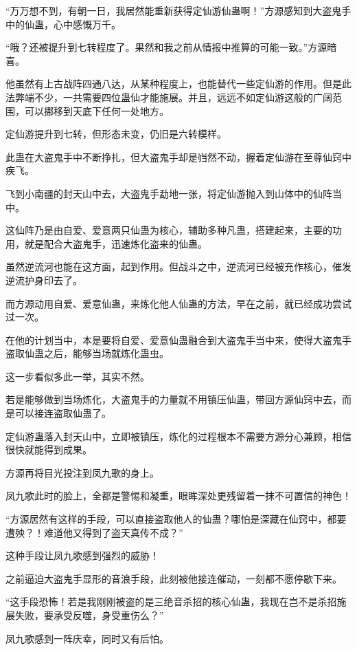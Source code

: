 
\begin{this_body}

“万万想不到，有朝一日，我居然能重新获得定仙游仙蛊啊！”方源感知到大盗鬼手中的仙蛊，心中感慨万千。

“哦？还被提升到七转程度了。果然和我之前从情报中推算的可能一致。”方源暗喜。

他虽然有上古战阵四通八达，从某种程度上，也能替代一些定仙游的作用。但是此法弊端不少，一共需要四位蛊仙才能施展。并且，远远不如定仙游这般的广阔范围，可以挪移到天底下任何一处地方。

定仙游提升到七转，但形态未变，仍旧是六转模样。

此蛊在大盗鬼手中不断挣扎，但大盗鬼手却是岿然不动，握着定仙游在至尊仙窍中疾飞。

飞到小南疆的封天山中去，大盗鬼手勐地一张，将定仙游抛入到山体中的仙阵当中。

这仙阵乃是由自爱、爱意两只仙蛊为核心，辅助多种凡蛊，搭建起来，主要的功用，就是配合大盗鬼手，迅速炼化盗来的仙蛊。

虽然逆流河也能在这方面，起到作用。但战斗之中，逆流河已经被充作核心，催发逆流护身印去了。

而方源动用自爱、爱意仙蛊，来炼化他人仙蛊的方法，早在之前，就已经成功尝试过一次。

在他的计划当中，本是要将自爱、爱意仙蛊融合到大盗鬼手当中来，使得大盗鬼手盗取仙蛊之后，能够当场就炼化蛊虫。

这一步看似多此一举，其实不然。

若是能够做到当场炼化，大盗鬼手的力量就不用镇压仙蛊，带回方源仙窍中去，而是可以接连盗取仙蛊了。

定仙游蛊落入封天山中，立即被镇压，炼化的过程根本不需要方源分心兼顾，相信很快就能得到成果。

方源再将目光投注到凤九歌的身上。

凤九歌此时的脸上，全都是警惕和凝重，眼眸深处更残留着一抹不可置信的神色！

“方源居然有这样的手段，可以直接盗取他人的仙蛊？哪怕是深藏在仙窍中，都要遭殃？！难道他又得到了盗天真传不成？”

这种手段让凤九歌感到强烈的威胁！

之前逼迫大盗鬼手显形的音浪手段，此刻被他接连催动，一刻都不愿停歇下来。

“这手段恐怖！若是我刚刚被盗的是三绝音杀招的核心仙蛊，我现在岂不是杀招施展失败，要承受反噬，身受重伤么？”

凤九歌感到一阵庆幸，同时又有后怕。


\end{this_body}
